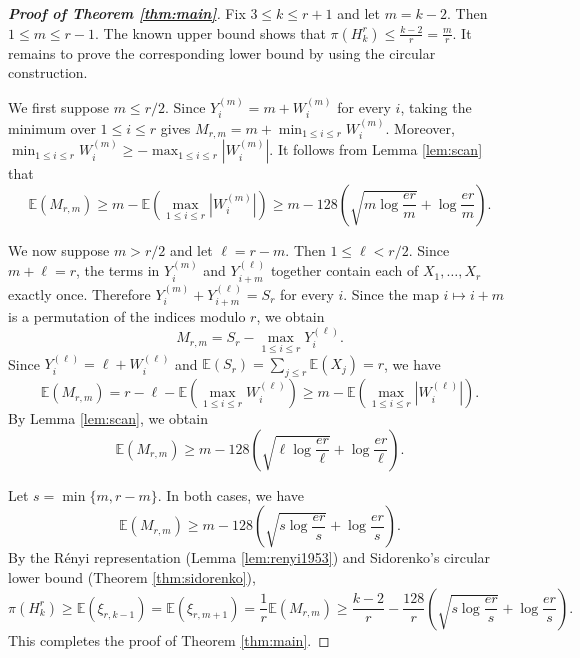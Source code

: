 \documentclass[12pt,a4paper]{article}
\numberwithin{equation}{section}
\theoremstyle{definition}
\theoremstyle{remark}
\begin{document}
\begin{proof}[\bfseries{Proof of Theorem \ref{thm:main}}]
Fix $3\le k\le r+1$ and let $m=k-2$.  Then $1\le m\le r-1$.
The known upper bound shows that
 $\pi(H_k^r)\le\frac{k-2}{r}=\frac mr.$
It remains to prove the corresponding lower bound by using the circular construction.

We first suppose $m\le r/2$.  Since
$Y_i^{(m)}=m+W_i^{(m)}$ for every $i$, taking the minimum over
$1\le i\le r$ gives
$M_{r,m}=m+\min_{1\le i\le r}W_i^{(m)}$.
Moreover,
$\min_{1\le i\le r}W_i^{(m)}
\ge-\max_{1\le i\le r}|W_i^{(m)}|$.
It follows from Lemma \ref{lem:scan} that
$$ \mathbb{E}(M_{r,m})
 \ge m-\mathbb{E}\left(\max_{1\le i\le r}|W_i^{(m)}|\right)
 \ge m-128\left(\sqrt{m\log\frac{er}{m}}+\log\frac{er}{m}\right).$$

We now suppose $m>r/2$ and let $\ell=r-m$.  Then $1\le\ell<r/2$.  Since
$m+\ell=r$, the terms in $Y_i^{(m)}$ and $Y_{i+m}^{(\ell)}$ together contain each of
$X_1,\ldots,X_r$ exactly once.  Therefore
$Y_i^{(m)}+Y_{i+m}^{(\ell)}=S_r$ for every $i$.  Since the map
$i\mapsto i+m$ is a permutation of the indices modulo $r$, we obtain
\begin{equation}\label{eq:complement-identity}
 M_{r,m}=S_r-\max_{1\le i\le r}Y_i^{(\ell)}.
\end{equation}
Since $Y_i^{(\ell)}=\ell+W_i^{(\ell)}$ and
$\mathbb{E}(S_r)=\sum_{j\le r} \mathbb{E}(X_j)=r$, we have
$$ \mathbb{E}(M_{r,m})
 =r-\ell-\mathbb{E}\left(\max_{1\le i\le r}W_i^{(\ell)}\right)
 \ge m-\mathbb{E}\left(\max_{1\le i\le r}|W_i^{(\ell)}|\right).$$
By Lemma \ref{lem:scan}, we obtain
$$ \mathbb{E}(M_{r,m})
 \ge m-128\left(\sqrt{\ell\log\frac{er}{\ell}}
                 +\log\frac{er}{\ell}\right).$$

Let $s=\min\{m,r-m\}$.  
In both cases, we have
$$
 \mathbb{E}(M_{r,m})
 \ge m-128\left(\sqrt{s\log\frac{er}{s}}
                 +\log\frac{er}{s}\right).
$$
By the R\'enyi representation (Lemma \ref{lem:renyi1953}) and Sidorenko's circular lower bound (Theorem \ref{thm:sidorenko}),
$$ \pi(H_k^r)
 \ge\mathbb{E}(\xi_{r,k-1})
 =\mathbb{E}(\xi_{r,m+1})
 =\frac1r\mathbb{E}(M_{r,m})
 \ge\frac{k-2}{r}-\frac{128}{r}
 \left(\sqrt{s\log\frac{er}{s}}+\log\frac{er}{s}\right).$$
This completes the proof of Theorem \ref{thm:main}.
\end{proof}
\end{document}
